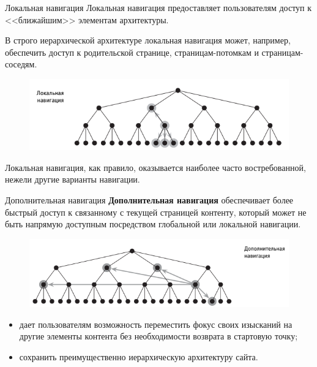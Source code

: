 \documentclass{beamer}
\begin{document}
\begin{frame}[t]{Локальная навигация}
Локальная навигация предоставляет пользователям доступ к <<ближайшим>> элементам архитектуры. 

В строго иерархической архитектуре локальная навигация может,
например, обеспечить доступ к родительской странице, страницам-потомкам и страницам-соседям. 
\begin{figure}[h]
\centering
\includegraphics[scale=0.5]{images/lec04-pic13.png}
\end{figure}
Локальная навигация, как правило, оказывается наиболее часто востребованной, нежели другие варианты навигации.
\end{frame}

\begin{frame}[t]{Дополнительная навигация}
\textbf{Дополнительная навигация} обеспечивает более быстрый доступ к связанному с текущей страницей контенту, который может не быть напрямую доступным посредством глобальной или локальной навигации.
\begin{figure}[h]
\centering
\includegraphics[scale=0.5]{images/lec04-pic14.png}
\end{figure}
\begin{itemize}
\item дает пользователям возможность переместить фокус своих изысканий на другие элементы контента без необходимости возврата в стартовую точку;
\item сохранить преимущественно иерархическую архитектуру сайта.
\end{itemize}
\end{frame}
\end{document}
